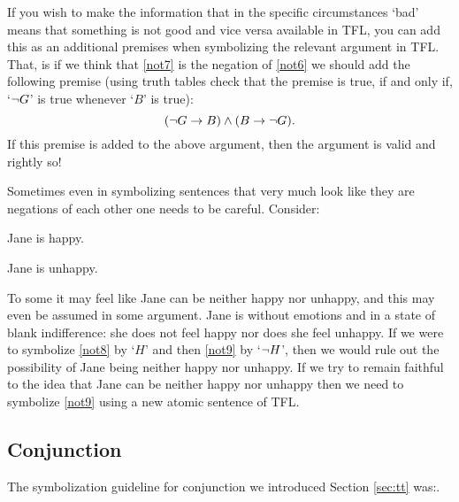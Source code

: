 
If you wish to make the information that in the specific circumstances `bad' means that something is not good and vice versa available in TFL, you can add this as an additional premises when symbolizing the relevant argument in TFL. That, is if we think that \ref{not7} is the negation of \ref{not6} we should add the following premise (using truth tables check that the premise is true, if and only if, `$\neg G$' is true whenever `$B$' is true): $$(\neg G\rightarrow B)\mathbin{\wedge} (B\rightarrow \neg G).$$ If this premise is added to the above argument, then the argument is valid and rightly so!

Sometimes even in symbolizing sentences that very much look like they are negations of each other one needs to be careful. Consider:
	\begin{earg}
		\item[\ex{not8}] Jane is happy.
		\item[\ex{not9}] Jane is unhappy.
	\end{earg}
To some it may feel like Jane can be neither happy nor unhappy, and this may even be assumed in some argument. Jane is without emotions and in a state of blank indifference: she does not feel happy nor does she feel unhappy. If we were to symbolize \ref{not8} by `$H$' and then \ref{not9} by `$\neg H$', then we would rule out the possibility of Jane being neither happy nor unhappy. If we try to remain faithful to the idea that Jane can be neither happy nor unhappy then we need to symbolize \ref{not9} using a new atomic sentence of TFL.

\subsection{Conjunction}
\label{s:ConnectiveConjunction}

The symbolization guideline for conjunction we introduced Section \ref{sec:tt} was:.




